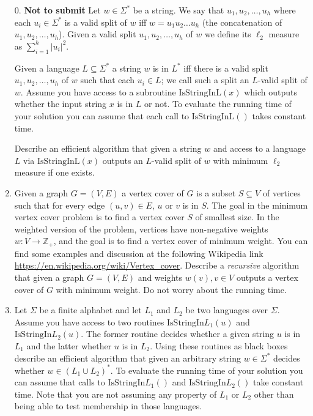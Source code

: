\documentclass[11pt]{article}
\newcommand{\IsSinL}{\text{IsStringInL}}
\newcommand{\IsSinlang}[1]{\text{IsStringIn}L_{#1}}
\begin{document}
\begin{enumerate}


\item[0.] {\bf Not to submit}  Let $w \in \Sigma^*$ be a string. We say that
  $u_1,u_2,\ldots,u_h$ where each $u_i \in \Sigma^*$ is a valid split
  of $w$ iff $w = u_1u_2\ldots u_h$ (the concatenation of
  $u_1,u_2,\ldots,u_h$). Given a valid split $u_1,u_2,\ldots,u_h$ of
  $w$ we define its $\ell_2$ measure as $\sum_{i=1}^h |u_i|^2$.

  Given a language $L \subseteq \Sigma^*$ a string $w$ is in $L^*$ iff
  there is a valid split $u_1,u_2,\ldots,u_h$ of $w$ such that each
  $u_i \in L$; we call such a split an $L$-valid split of $w$.  Assume
  you have access to a subroutine $\IsSinL(x)$ which outputs whether
  the input string $x$ is in $L$ or not. To evaluate the running time
  of your solution you can assume that each call to $\IsSinL()$ takes
  constant time.

  Describe an efficient algorithm that given a string $w$ and access to
  a language $L$ via $\IsSinL(x)$ outputs an $L$-valid split of $w$
  with minimum $\ell_2$ measure if one exists.

\item Given a graph $G=(V,E)$ a vertex cover of $G$ is a subset
  $S \subseteq V$ of vertices such that for every edge $(u,v) \in E$,
  $u$ or $v$ is in $S$. The goal in the minimum vertex cover problem
  is to find a vertex cover $S$ of smallest size. In the weighted
  version of the problem, vertices have non-negative weights
  $w: V \rightarrow \mathbb{Z}_+$, and the goal is to find a vertex
  cover of minimum weight.  You can find some examples and discussion
  at the following Wikipedia link
  \url{https://en.wikipedia.org/wiki/Vertex_cover}.  Describe a {\em
    recursive} algorithm that given a graph $G=(V,E)$ and weights
  $w(v), v \in V$ outputs a vertex cover of $G$ with minimum
  weight. Do not worry about the running time.

\item Let $\Sigma$ be a finite alphabet and let $L_1$ and $L_2$ be two
  languages over $\Sigma$. Assume you have access to two routines
  $\IsSinlang{1}(u)$ and $\IsSinlang{2}(u)$. The former routine
  decides whether a given string $u$ is in $L_1$ and the latter
  whether $u$ is in $L_2$. Using these routines as black boxes
  describe an efficient algorithm that given an arbitrary string
  $w \in \Sigma^*$ decides whether $w \in (L_1 \cup L_2)^*$. To
  evaluate the running time of your solution you can assume that calls
  to $\IsSinlang{1}()$ and $\IsSinlang{2}()$ take constant time. Note
  that you are not assuming any property of $L_1$ or $L_2$ other than
  being able to test membership in those languages.



\end{enumerate}
\end{document}
